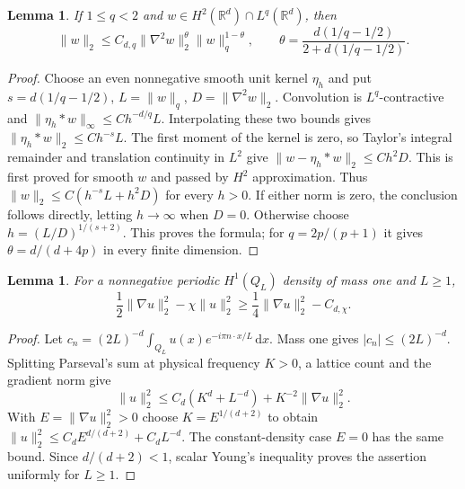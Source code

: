 \documentclass[11pt]{article}
\numberwithin{equation}{section}
\newtheorem{lemma}[theorem]{Lemma}
\theoremstyle{definition}
\theoremstyle{remark}
\newcommand{\R}{\mathbb R}
\newcommand{\dd}{\,\mathrm d}
\newcommand{\norm}[1]{\lVert #1\rVert}
\begin{document}
\begin{lemma}\label{lem:GN}
If $1\le q<2$ and $w\in H^2(\R^d)\cap L^q(\R^d)$, then
\[
 \norm w_2\le C_{d,q}\norm{\nabla^2w}_2^\theta\norm w_q^{1-\theta},
 \qquad
 \theta=\frac{d(1/q-1/2)}{2+d(1/q-1/2)}.
\]
\end{lemma}
\begin{proof}
Choose an even nonnegative smooth unit kernel $\eta_h$ and put
$s=d(1/q-1/2)$, $L=\norm w_q$, $D=\norm{\nabla^2w}_2$.
Convolution is $L^q$-contractive and
$\norm{\eta_h*w}_\infty\le C h^{-d/q}L$.
Interpolating these two bounds gives
$\norm{\eta_h*w}_2\le C h^{-s}L$.
The first moment of the kernel is zero, so Taylor's integral remainder
and translation continuity in $L^2$ give
$\norm{w-\eta_h*w}_2\le C h^2D$.
This is first proved for smooth $w$ and passed by $H^2$ approximation.
Thus $\norm w_2\le C(h^{-s}L+h^2D)$ for every $h>0$.
If either norm is zero, the conclusion follows directly, letting
$h\to\infty$ when $D=0$. Otherwise choose
$h=(L/D)^{1/(s+2)}$. This proves the formula; for
$q=2p/(p+1)$ it gives $\theta=d/(d+4p)$ in every finite dimension.
\end{proof}

\begin{lemma}\label{lem:periodic-coercivity}
For a nonnegative periodic $H^1(Q_L)$ density of mass one and $L\ge1$,
\[
 \frac12\norm{\nabla u}_2^2-\chi\norm u_2^2
                      \ge\frac14\norm{\nabla u}_2^2-C_{d,\chi}.
\]
\end{lemma}
\begin{proof}
Let $c_n=(2L)^{-d}\int_{Q_L}u(x)e^{-i\pi n\cdot x/L}\dd x$.
Mass one gives $|c_n|\le(2L)^{-d}$.
Splitting Parseval's sum at physical frequency $K>0$, a lattice count
and the gradient norm give
\[
 \norm u_2^2\le C_d(K^d+L^{-d})+K^{-2}\norm{\nabla u}_2^2.
\]
With $E=\norm{\nabla u}_2^2>0$ choose $K=E^{1/(d+2)}$ to obtain
$\norm u_2^2\le C_dE^{d/(d+2)}+C_dL^{-d}$.
The constant-density case $E=0$ has the same bound.
Since $d/(d+2)<1$, scalar Young's inequality proves the assertion
uniformly for $L\ge1$.
\end{proof}
\end{document}
